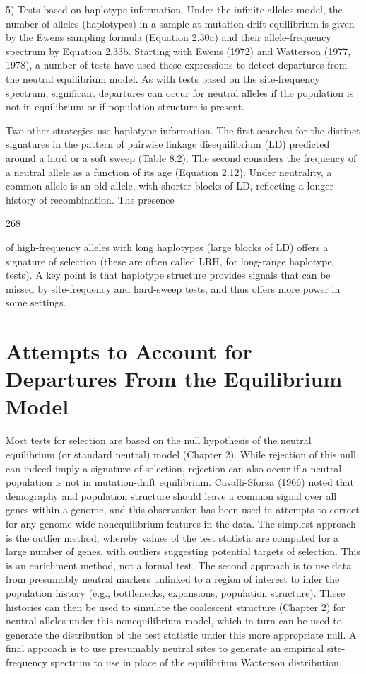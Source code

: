 \documentclass{article}
\begin{document}
5) Tests based on haplotype information. Under the infinite-alleles model, the number of alleles (haplotypes) in a sample at mutation-drift equilibrium is given by the Ewens sampling formula (Equation 2.30a) and their allele-frequency spectrum by Equation 2.33b. Starting with Ewens (1972) and Watterson (1977, 1978), a number of tests have used these expressions to detect departures from the neutral equilibrium model. As with tests based on the site-frequency spectrum, significant departures can occur for neutral alleles if the population is not in equilibrium or if population structure is present.

Two other strategies use haplotype information. The first searches for the distinct signatures in the pattern of pairwise linkage disequilibrium (LD) predicted around a hard or a soft sweep (Table 8.2). The second considers the frequency of a neutral allele as a function of its age (Equation 2.12). Under neutrality, a common allele is an old allele, with shorter blocks of LD, reflecting a longer history of recombination. The presence

268

of high-frequency alleles with long haplotypes (large blocks of LD) offers a signature of selection (these are often called LRH, for long-range haplotype, tests). A key point is that haplotype structure provides signals that can be missed by site-frequency and hard-sweep tests, and thus offers more power in some settings.

\section{Attempts to Account for Departures From the Equilibrium Model}
Most tests for selection are based on the null hypothesis of the neutral equilibrium (or standard neutral) model (Chapter 2). While rejection of this null can indeed imply a signature of selection, rejection can also occur if a neutral population is not in mutation-drift equilibrium. Cavalli-Sforza (1966) noted that demography and population structure should leave a common signal over all genes within a genome, and this observation has been used in attempts to correct for any genome-wide nonequilibrium features in the data. The simplest approach is the outlier method, whereby values of the test statistic are computed for a large number of genes, with outliers suggesting potential targets of selection. This is an enrichment method, not a formal test. The second approach is to use data from presumably neutral markers unlinked to a region of interest to infer the population history (e.g., bottlenecks, expansions, population structure). These histories can then be used to simulate the coalescent structure (Chapter 2) for neutral alleles under this nonequilibrium model, which in turn can be used to generate the distribution of the test statistic under this more appropriate null. A final approach is to use presumably neutral sites to generate an empirical site-frequency spectrum to use in place of the equilibrium Watterson distribution.
\end{document}
